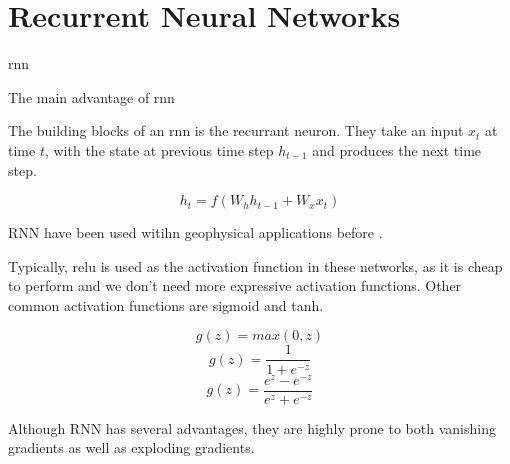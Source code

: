 \section{Recurrent Neural Networks}

\acrfull{rnn}

The main advantage of \acrshort{rnn} 

The building blocks of an \acrshort{rnn} is the recurrant neuron. They take an input $x_t$ at time $t$, with the state at previous time step $h_{t-1}$ and produces the next time step. 

\begin{equation}
    h_t = f(W_hh_{t-1}+W_xx_t)
\end{equation}

RNN have been used witihn geophysical applications before \cite{maulik2020recurrent}. 

Typically, \acrshort{relu} is used as the activation function in these networks, as it is cheap to perform and we don't need more expressive activation functions. Other common activation functions are sigmoid and tanh. 

$$g(z) = max(0, z)$$
$$g(z) = \frac{1}{1 + e^{-z}}$$
$$g(z) = \frac{e^z - e^{-z}}{e^z + e^{-z}}$$

Although RNN has several advantages, they are highly prone to both vanishing gradients as well as exploding gradients. 
